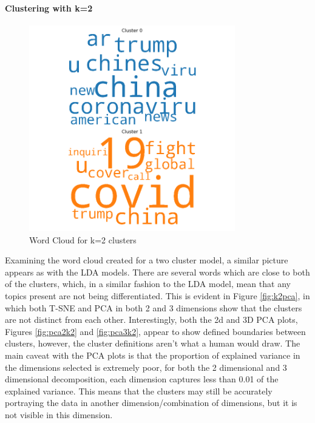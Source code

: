 \paragraph{Clustering with k=2}
\begin{figure}[H]
	\centering
	\includegraphics[width=0.8\textwidth]{images/kmeans_word_cloud_k=2.png}
	\caption{Word Cloud for k=2 clusters}
	\label{fig:wck2}
\end{figure}
Examining the word cloud created for a two cluster model, a similar picture appears as with the LDA models. There are several words which are close to both of the clusters, which, in a similar fashion to the LDA model, mean that any topics present are not being differentiated. This is evident in Figure \ref{fig:k2pca}, in which both T-SNE and PCA in both 2 and 3 dimensions show that the clusters are not distinct from each other. Interestingly, both the 2d and 3D PCA plots, Figures \ref{fig:pca2k2} and \ref{fig:pca3k2}, appear to show defined boundaries between clusters, however, the cluster definitions aren't what a human would draw. The main caveat with the PCA plots is that the proportion of explained variance in the dimensions selected is extremely poor, for both the 2 dimensional and 3 dimensional decomposition, each dimension captures less than 0.01 of the explained variance. This means that the clusters may still be accurately portraying the data in another dimension/combination of dimensions, but it is not visible in this dimension. 

